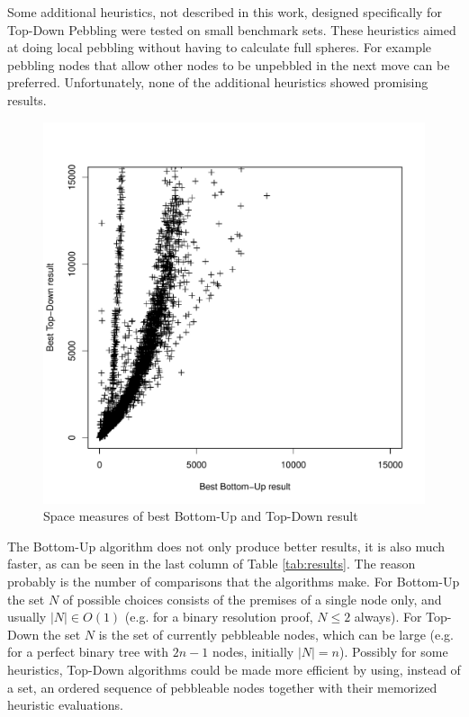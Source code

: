 Some additional heuristics, not described in this work, designed specifically for Top-Down Pebbling were tested on small benchmark sets.
These heuristics aimed at doing local pebbling without having to calculate full spheres.
For example pebbling nodes that allow other nodes to be unpebbled in the next move can be preferred.
Unfortunately, none of the additional heuristics showed promising results.


\begin{figure}
	\centering
	\includegraphics[scale=0.5]{chapters/pebbling/figures/td_vs_bu.pdf}
	\caption{Space measures of best Bottom-Up and Top-Down result}
	\label{fig:BUvsTD}
\end{figure}

The Bottom-Up algorithm does not only produce better results, it is also much faster, as can be seen in the last column of Table \ref{tab:results}. 
The reason probably is the number of comparisons that the algorithms make. 
For Bottom-Up the set $N$ of possible choices consists of the premises of a single node only, and usually $|N| \in O(1)$ (e.g. for a binary resolution proof, $N \leq 2$ always). 
For Top-Down the set $N$ is the set of currently pebbleable nodes, which can be large (e.g. for a perfect binary tree with $2n -1$ nodes, initially $|N| = n$). 
Possibly for some heuristics, Top-Down algorithms could be made more efficient by using, instead of a set, an ordered sequence of pebbleable nodes together with their memorized heuristic evaluations.

